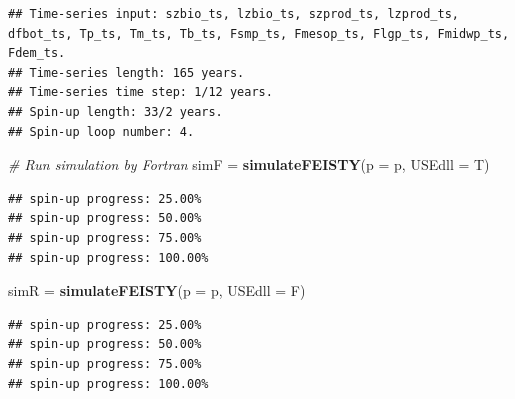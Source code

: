 \documentclass[
]{article}
\newenvironment{Shaded}{\begin{snugshade}}{\end{snugshade}}
\newcommand{\AttributeTok}[1]{\textcolor[rgb]{0.13,0.29,0.53}{#1}}
\newcommand{\CommentTok}[1]{\textcolor[rgb]{0.56,0.35,0.01}{\textit{#1}}}
\newcommand{\DecValTok}[1]{\textcolor[rgb]{0.00,0.00,0.81}{#1}}
\newcommand{\FloatTok}[1]{\textcolor[rgb]{0.00,0.00,0.81}{#1}}
\newcommand{\FunctionTok}[1]{\textcolor[rgb]{0.13,0.29,0.53}{\textbf{#1}}}
\newcommand{\NormalTok}[1]{#1}
\newcommand{\OtherTok}[1]{\textcolor[rgb]{0.56,0.35,0.01}{#1}}
\newcommand{\SpecialCharTok}[1]{\textcolor[rgb]{0.81,0.36,0.00}{\textbf{#1}}}
\newcommand{\StringTok}[1]{\textcolor[rgb]{0.31,0.60,0.02}{#1}}
\begin{document}
\begin{verbatim}
## Time-series input: szbio_ts, lzbio_ts, szprod_ts, lzprod_ts, dfbot_ts, Tp_ts, Tm_ts, Tb_ts, Fsmp_ts, Fmesop_ts, Flgp_ts, Fmidwp_ts, Fdem_ts. 
## Time-series length: 165 years. 
## Time-series time step: 1/12 years. 
## Spin-up length: 33/2 years. 
## Spin-up loop number: 4.
\end{verbatim}

\begin{Shaded}
\begin{Highlighting}[]
\CommentTok{\# Run simulation by Fortran}
\NormalTok{simF }\OtherTok{=} \FunctionTok{simulateFEISTY}\NormalTok{(}\AttributeTok{p =}\NormalTok{ p, }\AttributeTok{USEdll =}\NormalTok{ T)}
\end{Highlighting}
\end{Shaded}

\begin{verbatim}
## spin-up progress: 25.00%
## spin-up progress: 50.00%
## spin-up progress: 75.00%
## spin-up progress: 100.00%
\end{verbatim}

\begin{Shaded}
\begin{Highlighting}[]
\NormalTok{simR }\OtherTok{=} \FunctionTok{simulateFEISTY}\NormalTok{(}\AttributeTok{p =}\NormalTok{ p, }\AttributeTok{USEdll =}\NormalTok{ F)}
\end{Highlighting}
\end{Shaded}

\begin{verbatim}
## spin-up progress: 25.00%
## spin-up progress: 50.00%
## spin-up progress: 75.00%
## spin-up progress: 100.00%
\end{verbatim}

\begin{Shaded}
\end{Shaded}
\end{document}
